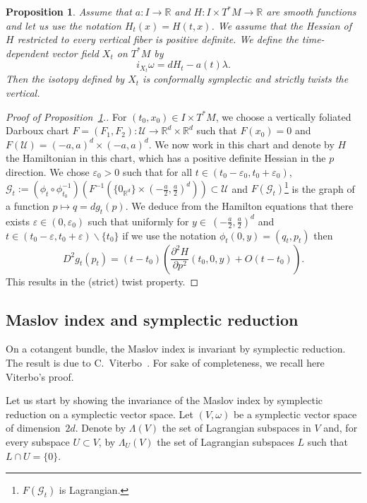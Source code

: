 \documentclass[10pt,a4paper]{amsart}
\numberwithin{equation}{section}
\newcommand*\cg{\mathcal{G}}
\newcommand*\cU{\mathcal{U}}
\newcommand*\cal{\mathcal}
\newcommand*\R{\mathbb{R}}
\newtheorem{prop}[theo]{Proposition}
\theoremstyle{definition}
\theoremstyle{remark}
\begin{document}
\begin{prop}\label{PHconvextwist}
Assume that $a:I\rightarrow \R$ and $H:I\times T^*M\rightarrow \R$ are smooth functions and let us use the notation $H_t(x)=H(t, x)$. We assume that the Hessian of $H$ restricted to every vertical fiber is positive definite. We define the time-dependent vector field $X_t$ on $T^*M$ by
\[
i_{X_t}\omega=dH_t-a(t)\lambda.
\]
Then the isotopy defined by $X_t$ is conformally symplectic and strictly twists the vertical.
\end{prop}

\begin{proof}[Proof of Proposition~\ref{PHconvextwist}.] For $(t_0, x_0)\in I\times T^*M$, we choose a vertically foliated Darboux chart $F=(F_1, F_2):\cU \rightarrow \R^d\times \R^d$ such that $F(x_0)=0$ and $F(\cal U)=(-a, a)^{d}\times (-a, a)^d$.\newline
We now work in this chart and denote by $H$ the Hamiltonian in this chart, which has a positive definite Hessian in the $p$ direction. We chose $\varepsilon_0 >0$ such that for all $t\in (t_0-\varepsilon_0, t_0+\varepsilon_0)$, ${\cg}_t:=(\phi_t\circ\phi_{t_0}^{-1})(F^{-1}(\{ 0_{\R^d}\}\times (-\frac{a}{2}, \frac{a}{2})^d)) \subset\cU$ and $F({\cg_t})$\footnote{$F({\cg_t})$ is Lagrangian.} is the graph of a function $p\mapsto q=dg_t(p)$. We deduce from the Hamilton equations that there exists $\varepsilon\in (0, \varepsilon_0)$ such that uniformly for $y\in \ (-\frac{a}{2}, \frac{a}{2})^d$ and $t\in (t_0-\varepsilon, t_0+\varepsilon)\backslash \{t_0\}$ if we use the notation $\phi_t(0, y)=(q_t, p_t)$ then
\[
D^2g_t(p_t)= (t-t_0)\left(\frac{\partial^2 H}{\partial p^2}(t_0, 0, y)+O(t-t_0)\right).
\]
This results in the {(strict) }twist property.
\end{proof}

\subsection{Maslov index and symplectic reduction}\label{sym reduction}
On a cotangent bundle, the Maslov index is invariant by symplectic reduction. The result is due to C.~Viterbo~\cite{Vit1987}. For sake of completeness, we recall here Viterbo's proof.


Let us start by showing the invariance of the Maslov index by symplectic reduction on a symplectic vector space. Let $(V,\omega)$ be a symplectic vector space of dimension~$2d$. Denote by $\Lambda(V)$ the set of Lagrangian subspaces in $V$ and, for every subspace $U\subset V$, by $\Lambda_U(V)$ the set of Lagrangian subspaces $L$ such that $L\cap U=\{0\}$.
\end{document}
